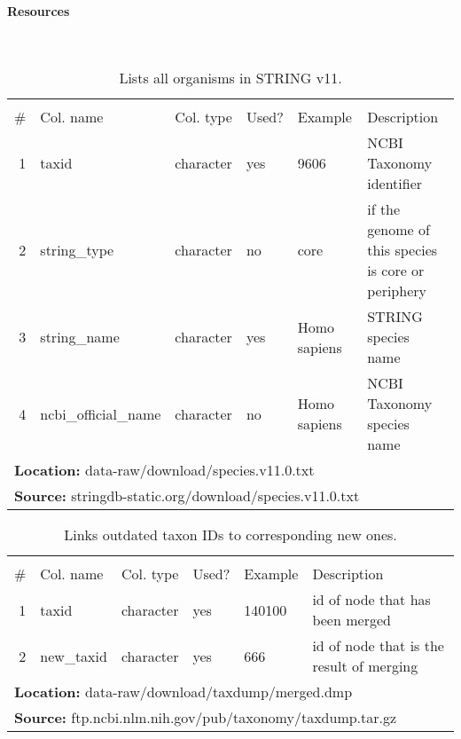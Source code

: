 \texttt{}

\hypertarget{resources}{%
\paragraph{\texorpdfstring{\textbf{Resources}}{Resources}}\label{resources}}

\texttt{}\\

\begin{table}[H]

\caption{\label{tab:string_species}Lists all organisms in STRING v11.}
\begin{tabular}[t]{rllll>{\raggedright\arraybackslash}p{18em}}
\toprule
\multicolumn{6}{c}{\bgroup\fontsize{12}{14}\selectfont \cellcolor[HTML]{EEEEEE}{\ttfamily{\textbf{string\_species}}}\egroup{}} \\
\cmidrule(l{3pt}r{3pt}){1-6}
\# & Col. name & Col. type & Used? & Example & Description\\
\midrule
\rowcolor{gray!6}  1 & taxid & character & yes & 9606 & NCBI Taxonomy identifier\\
2 & string\_type & character & no & core & if the genome of this species is core or periphery\\
\rowcolor{gray!6}  3 & string\_name & character & yes & Homo sapiens & STRING species name\\
4 & ncbi\_official\_name & character & no & Homo sapiens & NCBI Taxonomy species name\\
\bottomrule
\multicolumn{6}{l}{\textbf{Location: } data-raw/download/species.v11.0.txt}\\
\multicolumn{6}{l}{\textbf{Source: } stringdb-static.org/download/species.v11.0.txt}\\
\end{tabular}
\end{table}
\begin{table}[H]

\caption{\label{tab:ncbi_merged_ids}Links outdated taxon IDs to corresponding new ones.}
\begin{tabular}[t]{rllll>{\raggedright\arraybackslash}p{18em}}
\toprule
\multicolumn{6}{c}{\bgroup\fontsize{12}{14}\selectfont \cellcolor[HTML]{EEEEEE}{\ttfamily{\textbf{ncbi\_merged\_ids}}}\egroup{}} \\
\cmidrule(l{3pt}r{3pt}){1-6}
\# & Col. name & Col. type & Used? & Example & Description\\
\midrule
\rowcolor{gray!6}  1 & taxid & character & yes & 140100 & id of node that has been merged\\
2 & new\_taxid & character & yes & 666 & id of node that is the result of merging\\
\bottomrule
\multicolumn{6}{l}{\textbf{Location: } data-raw/download/taxdump/merged.dmp}\\
\multicolumn{6}{l}{\textbf{Source: } ftp.ncbi.nlm.nih.gov/pub/taxonomy/taxdump.tar.gz}\\
\end{tabular}
\end{table}
